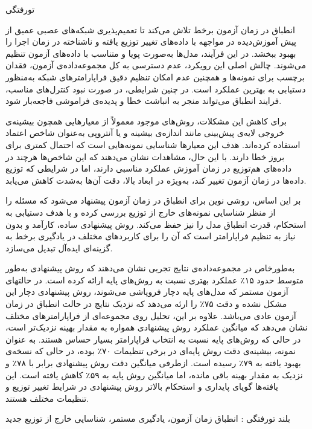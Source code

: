 
‌تورفتگی

انطباق در زمان آزمون برخط تلاش می‌کند تا تعمیم‌پذیری شبکه‌های عصبی عمیق از پیش آموزش‌دیده در مواجهه با داده‌های تغییر توزیع یافته و ناشناخته در زمان اجرا را بهبود ببخشد. در این فرآیند، مدل‌ها به‌صورت پویا و متناسب با داده‌های آزمون تنظیم می‌شوند. چالش اصلی این رویکرد، عدم دسترسی به کل مجموعه‌داده‌ی آزمون، فقدان برچسب برای نمونه‌ها و همچنین عدم امکان تنظیم دقیق فراپارامترهای شبکه به‌منظور دستیابی به بهترین عملکرد است. در چنین شرایطی، در صورت نبود کنترل‌های مناسب، فرایند انطباق می‌تواند منجر به انباشت خطا و پدیده‌ی فراموشی فاجعه‌بار شود.

برای کاهش این مشکلات، روش‌های موجود معمولاً از معیارهایی همچون بیشینه‌ی خروجی لایه‌ی پیش‌بینی مانند اندازه‌ی بیشینه و یا آنتروپی به‌عنوان شاخص اعتماد استفاده کرده‌اند. هدف این معیارها شناسایی نمونه‌هایی است که احتمال کمتری برای بروز خطا دارند. با این حال، مشاهدات نشان می‌دهند که این شاخص‌ها هرچند در داده‌های هم‌توزیع در زمان آموزش عملکرد مناسبی دارند، اما در شرایطی که توزیع داده‌ها در زمان آزمون تغییر کند، به‌ویژه در ابعاد بالا، دقت آن‌ها به‌شدت کاهش می‌یابد.

بر این اساس، روشی نوین برای انطباق در زمان آزمون پیشنهاد می‌شود که مسئله را از منظر شناسایی نمونه‌های خارج از توزیع بررسی کرده و با هدف دستیابی به استحکام، قدرت انطباق مدل را نیز حفظ می‌کند. روش پیشنهادی ساده، کارآمد و بدون نیاز به تنظیم فراپارامتر است که آن را برای کاربردهای مختلف در یادگیری برخط به گزینه‌ای ایده‌آل تبدیل می‌سازد. 

به‌طور‌خاص در مجموعه‌داده‌ی  نتایج تجربی نشان می‌دهند که روش پیشنهادی به‌طور متوسط حدود ۱۵٪ عملکرد بهتری نسبت به روش‌های پایه ارائه کرده است. در حالتهای آزمون مستمر که مدل‌های پایه دچار فروپاشی می‌شوند، روش پیشنهادی دچار این مشکل نشده و دقت ۷۵٪ را ارئه می‌دهد که نزدیک نتایج در حالت انطباق در زمان آزمون عادی می‌باشد. علاوه بر این، تحلیل روی مجموعه‌ای از فراپارامترهای مختلف نشان می‌دهد که میانگین عملکرد روش پیشنهادی همواره به مقدار بهینه نزدیک‌تر است، در حالی که روش‌های پایه نسبت به انتخاب فراپارامتر بسیار حساس هستند. به عنوان نمونه، بیشینه‌ی دقت روش پایه‌ای  در برخی تنظیمات ۷۰٪ بوده، در حالی که نسخه‌ی بهبود یافته به ۷۹٪ رسیده است. ازطرفی میانگین دقت روش پیشنهادی برابر با ۷۸٪ و نزدیک به مقدار بهینه باقی مانده، اما میانگین روش پایه به ۵۹٪ کاهش یافته است. این یافته‌ها گویای پایداری و استحکام بالاتر روش پیشنهادی در شرایط تغییر توزیع و تنظیمات مختلف هستند.

‌بلند
‌تورفتگی : 
انطباق زمان آزمون، یادگیری مستمر، شناسایی خارج از توزیع
‌جدید
